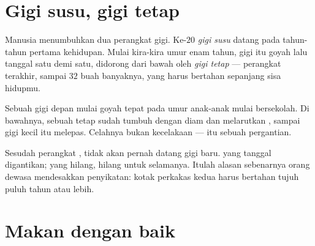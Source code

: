\section{Gigi susu, gigi tetap}

\begin{proposition}\label{prop:g2:teeth-and-eating-well:sets}
Manusia menumbuhkan dua perangkat gigi. Ke-$20$ \emph{gigi
susu} datang pada tahun-tahun pertama kehidupan.
Mulai kira-kira umur enam tahun, gigi itu goyah lalu tanggal satu demi
satu, didorong dari bawah oleh \emph{gigi tetap} ---
perangkat terakhir, sampai $32$ buah banyaknya, yang harus bertahan
sepanjang sisa hidupmu.
\end{proposition}
\admitted

\begin{example}\label{ex:g2:teeth-and-eating-well:wobbly}
Sebuah gigi depan mulai goyah tepat pada umur anak-anak mulai
bersekolah. Di bawahnya, sebuah  tetap sudah tumbuh dengan
diam dan melarutkan  , sampai gigi kecil itu melepas.
Celahnya bukan kecelakaan --- itu sebuah pergantian.
\end{example}

\begin{remark}\label{rem:g2:teeth-and-eating-well:nothird}
Sesudah perangkat , tidak akan pernah datang gigi baru.  yang tanggal digantikan;  yang hilang, hilang untuk
selamanya. Itulah alasan sebenarnya orang dewasa mendesakkan
penyikatan: kotak perkakas kedua harus bertahan tujuh puluh tahun atau
lebih.
\end{remark}

\section{Makan dengan baik}

